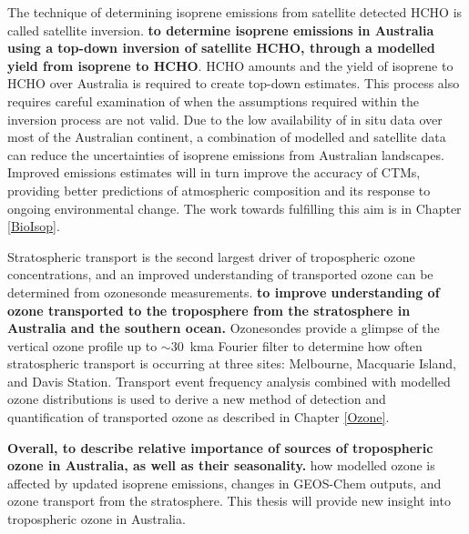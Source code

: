   The technique of determining isoprene emissions from satellite detected HCHO is called satellite inversion.
  \textbf{to determine isoprene emissions in Australia using a top-down inversion of satellite HCHO, through a modelled yield from isoprene to HCHO}.
  HCHO amounts and the yield of isoprene to HCHO over Australia is required to create top-down estimates.
  This process also requires careful examination of when the assumptions required within the inversion process are not valid.
  Due to the low availability of in situ data over most of the Australian continent, a combination of modelled and satellite data can reduce the uncertainties of isoprene emissions from Australian landscapes.
  Improved emissions estimates will in turn improve the accuracy of CTMs, providing better predictions of atmospheric composition and its response to ongoing environmental change.
  The work towards fulfilling this aim is in Chapter \ref{BioIsop}.
  
  Stratospheric transport is the second largest driver of tropospheric ozone concentrations, and an improved understanding of transported ozone can be determined from ozonesonde measurements.
  \textbf{to improve understanding of ozone transported to the troposphere from the stratosphere in Australia and the southern ocean.}
  Ozonesondes provide a glimpse of the vertical ozone profile up to $\sim 30$~kma Fourier filter  to determine how often stratospheric transport is occurring at three sites: Melbourne, Macquarie Island, and Davis Station. 
  Transport event frequency analysis combined with modelled ozone distributions is used to derive a new method of detection and quantification of transported ozone as described in Chapter \ref{Ozone}.
  
  
  \textbf{Overall, to describe relative importance of sources of tropospheric ozone in Australia, as well as their seasonality.}
  how modelled ozone is affected by updated isoprene emissions, changes in GEOS-Chem outputs, and ozone transport from the stratosphere.
  This thesis will provide new insight into tropospheric ozone in Australia.
  
